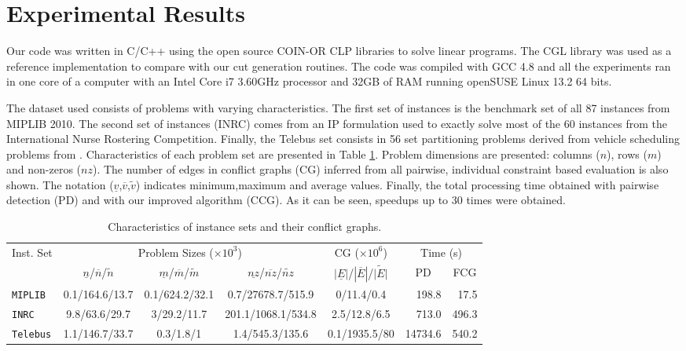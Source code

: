 \documentclass{endm}
\begin{document}
\section{Experimental Results}\label{experiments}

Our code was written in C/C++ using the open source COIN-OR CLP libraries to solve linear programs. The CGL library was used as a reference implementation to compare with our cut generation routines. The code was compiled with GCC 4.8 and all the experiments ran in one core of a computer with an Intel Core i7 3.60GHz processor and 32GB of RAM running openSUSE Linux 13.2 64 bits.

The dataset used consists of problems with varying characteristics. The first set of instances is the benchmark set of all 87 instances from MIPLIB 2010\cite{miplib}. The second set of instances (INRC) comes from an IP formulation  used to exactly solve \cite{Santos2014} most of the 60 instances from the International Nurse Rostering Competition\cite{haspeslagh}. Finally, the Telebus set consists in 56 set partitioning problems derived from vehicle scheduling problems from \cite{Borndorfer1998}. Characteristics of each problem set are presented in Table \ref{tab:inst}. Problem dimensions are presented: columns ($n$), rows ($m$) and non-zeros ($nz$). The number of edges in conflict graphs (CG) inferred from all pairwise, individual constraint based evaluation is also shown. The notation ($\underline{v}$,$\overline{v}$,$\tilde{v}$) indicates minimum,maximum and average values. Finally, the total processing time obtained with pairwise detection (PD) and with our improved algorithm (CCG). As it can be seen, speedups up to 30 times were obtained.

\begin{table}[h]
\scriptsize
\caption{Characteristics of instance sets and their conflict graphs.}\label{tab:inst}
\begin{center}
\begin{tabular}{|l|c|c|c|c|r|r|}
\hline 
\multirow{2}{0.8cm}{Inst. Set} & \multicolumn{3}{c|}{{Problem Sizes ($\times10^{3}$)}} & {CG ($\times10^{6}$)} & \multicolumn{2}{c|}{{Time (s)}}\tabularnewline
\cline{2-7} 
 & {$\underline{n}$/$\overline{n}$/$\tilde{n}$} & {$\underline{m}$/$\overline{m}$/$\tilde{m}$} & {$\underline{nz}$/$\overline{nz}$/$\tilde{nz}$} & {$|\underline{E}|$/$|\overline{E}|$/$\tilde{|E|}$} & \multicolumn{1}{c|}{PD} & \multicolumn{1}{c|}{FCG}\tabularnewline
\hline 
\hline 
\texttt{MIPLIB} & {0.1/164.6/13.7} & {0.1/624.2/32.1} & {0.7/27678.7/515.9} & {0/11.4/0.4} & {198.8} & {17.5}\tabularnewline
\hline 
\texttt{INRC} & {9.8/63.6/29.7} & {3/29.2/11.7} & {201.1/1068.1/534.8} & {2.5/12.8/6.5} & {713.0} & {496.3}\tabularnewline
\hline 
\texttt{Telebus} & {1.1/146.7/33.7} & {0.3/1.8/1} & {1.4/545.3/135.6} & {0.1/1935.5/80} & {14734.6} & {540.2}\tabularnewline
\hline 
\end{tabular}
\end{center}
\end{table}
\end{document}
